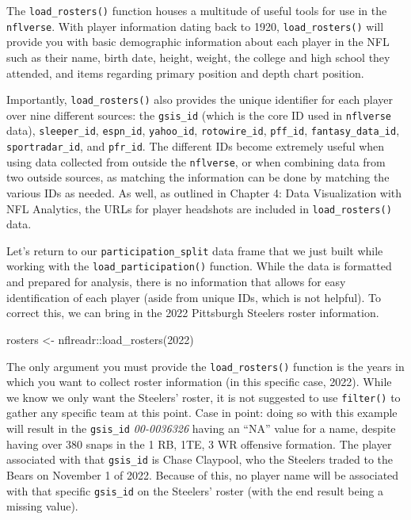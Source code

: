 \documentclass[
  letterpaper,
]{krantz}
\newenvironment{Shaded}{\begin{snugshade}}{\end{snugshade}}
\newcommand{\DecValTok}[1]{\textcolor[rgb]{0.68,0.00,0.00}{#1}}
\newcommand{\FunctionTok}[1]{\textcolor[rgb]{0.28,0.35,0.67}{#1}}
\newcommand{\NormalTok}[1]{\textcolor[rgb]{0.00,0.23,0.31}{#1}}
\newcommand{\OtherTok}[1]{\textcolor[rgb]{0.00,0.23,0.31}{#1}}
\newcommand{\SpecialCharTok}[1]{\textcolor[rgb]{0.37,0.37,0.37}{#1}}
\begin{document}
The \texttt{load\_rosters()} function houses a multitude of useful tools
for use in the \texttt{nflverse}. With player information dating back to
1920, \texttt{load\_rosters()} will provide you with basic demographic
information about each player in the NFL such as their name, birth date,
height, weight, the college and high school they attended, and items
regarding primary position and depth chart position.

Importantly, \texttt{load\_rosters()} also provides the unique
identifier for each player over nine different sources: the
\texttt{gsis\_id} (which is the core ID used in \texttt{nflverse} data),
\texttt{sleeper\_id}, \texttt{espn\_id}, \texttt{yahoo\_id},
\texttt{rotowire\_id}, \texttt{pff\_id}, \texttt{fantasy\_data\_id},
\texttt{sportradar\_id}, and \texttt{pfr\_id}. The different IDs become
extremely useful when using data collected from outside the
\texttt{nflverse}, or when combining data from two outside sources, as
matching the information can be done by matching the various IDs as
needed. As well, as outlined in Chapter 4: Data Visualization with NFL
Analytics, the URLs for player headshots are included in
\texttt{load\_rosters()} data.

Let's return to our \texttt{participation\_split} data frame that we
just built while working with the \texttt{load\_participation()}
function. While the data is formatted and prepared for analysis, there
is no information that allows for easy identification of each player
(aside from unique IDs, which is not helpful). To correct this, we can
bring in the 2022 Pittsburgh Steelers roster information.

\begin{Shaded}
\begin{Highlighting}[]
\NormalTok{rosters }\OtherTok{\textless{}{-}}\NormalTok{ nflreadr}\SpecialCharTok{::}\FunctionTok{load\_rosters}\NormalTok{(}\DecValTok{2022}\NormalTok{)}
\end{Highlighting}
\end{Shaded}

The only argument you must provide the \texttt{load\_rosters()} function
is the years in which you want to collect roster information (in this
specific case, 2022). While we know we only want the Steelers' roster,
it is not suggested to use \texttt{filter()} to gather any specific team
at this point. Case in point: doing so with this example will result in
the \texttt{gsis\_id} \emph{00-0036326} having an ``NA'' value for a
name, despite having over 380 snaps in the 1 RB, 1TE, 3 WR offensive
formation. The player associated with that \texttt{gsis\_id} is Chase
Claypool, who the Steelers traded to the Bears on November 1 of 2022.
Because of this, no player name will be associated with that specific
\texttt{gsis\_id} on the Steelers' roster (with the end result being a
missing value).
\end{document}
